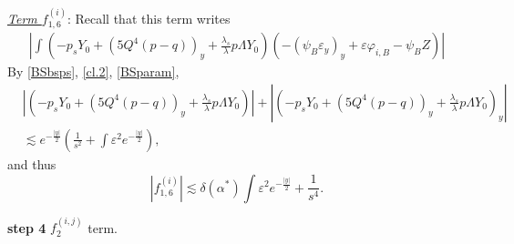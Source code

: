 \documentclass[11pt,a4paper,reqno]{amsart}
\theoremstyle{remark}
\numberwithin{equation}{section}
\def\e{\varepsilon}
\def\lsl{\frac{\lambda_s}{\lambda}}
\def\lsl{\frac{\lambda_s}{\lambda}}
\def\Yz{Y_0}
\begin{document}
\underline{{\em Term $f^{(i)}_{1,6}$}}: Recall that this term writes
\begin{align*}
\left| \int \left( -p_s \Yz + (5Q^4 (p-q))_y + \lsl p\Lambda \Yz\right)
\left( - (\psi_B \e_y)_y + \e \varphi_{i,B} - \psi_B Z\right) \right|
\end{align*} 
By \eqref{BSbsps}, \eqref{cl.2}, \eqref{BSparam},
\begin{align*}
& \left|  \left( -p_s \Yz + (5Q^4 (p-q))_y + \lsl p\Lambda \Yz\right)  \right|
+\left|  \left( -p_s \Yz + (5Q^4 (p-q))_y + \lsl p\Lambda \Yz\right)_y  \right|
\\ & \lesssim e^{-\frac {|y|}{2}} \left( \frac 1{s^2} + \int \e^2 e^{-\frac {|y|}{2}} \right), 
\end{align*}
and thus
$$
| f^{(i)}_{1,6}| \lesssim \delta(\alpha^*) \int \e^2 e^{-\frac {|y|}{2} } 
+\frac 1{s^4}.
$$

\medskip
{\bf step 4} $f_2^{(i,j)}$ term. 
 
\end{document}
